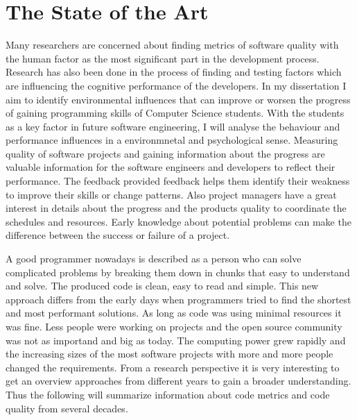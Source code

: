 \chapter{The State of the Art}

Many researchers are concerned about finding metrics of software quality with the human factor as the most significant part in the development process. 
Research has also been done in the process of finding and testing factors which are influencing the cognitive performance of the developers.
In my dissertation I aim to identify environmental influences that can improve or worsen the progress of gaining programming skills of Computer Science students.
With the students as a key factor in future software engineering, I will analyse the behaviour and performance influences in a environmnetal and psychological sense. 
\cite{denissen2008effects}
Measuring quality of software projects and gaining information about the progress are valuable information for the software engineers and developers to reflect their performance. The feedback provided feedback helps them identify their weakness to improve their skills or change patterns. 
\cite{johnson1999leap}
\cite{Martin:2008:CCH:1388398}
Also project managers have a great interest in details about the progress and the products quality to coordinate the schedules and resources. 
Early knowledge about potential problems can make the difference between the success or failure of a project.

A good programmer nowadays is described as a person who can solve complicated problems by breaking them down in chunks that easy to understand and solve. The produced code is clean, easy to read and simple. \cite{johnson1999leap}
This new approach differs from the early days when programmers tried to find the shortest and most performant solutions. As long as code was using minimal resources it was fine. Less people were working on projects and the open source community was not as importand and big as today. 
The computing power grew rapidly and the increasing sizes of the most software projects with more and more people changed the requirements. 
From a research perspective it is very interesting to get an overview approaches from different years to gain a broader understanding. Thus the following will summarize information about code metrics and code quality from several decades.


